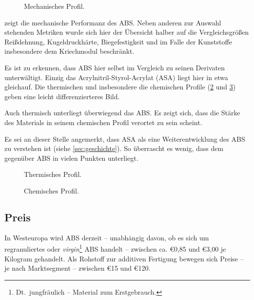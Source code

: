             \begin{figure}[h]
                \centering
                
                \caption{Mechanisches Profil.}
                \label{fig:pc mechanical profile}
            \end{figure}\par
             zeigt die mechanische Performanz des ABS\@. Neben anderen zur Auswahl stehenden
            Metriken wurde sich hier der Übersicht halber auf die Vergleichsgrößen Reißdehnung, Kugeldruckhärte, Biegefestigkeit
            und im Falle der Kunststoffe insbesondere dem Kriechmodul beschränkt.

            Es ist zu erkennen, dass ABS hier selbst im Vergleich zu seinen Derivaten unterwältigt. Einzig das
            Acrylnitril-Styrol-Acrylat (ASA) liegt hier in etwa gleichauf. Die thermischen und insbesondere die chemischen Profile
            (\cref{fig:pc thermal profile} und \cref{fig:pc chemical profile}) geben eine leicht differenzierteres Bild.

            Auch thermisch unterliegt überwiegend das ABS\@. Es zeigt sich, dass die Stärke des Materials in seinem chemischen
            Profil verortet zu sein scheint.

            Es sei an dieser Stelle angemerkt, dass ASA als eine Weiterentwicklung des ABS zu verstehen ist (siehe \cref{sec:geschichte}).
            So überrascht es wenig, dass dem gegenüber ABS in vielen Punkten unterliegt.
            \newpage
            \begin{figure}[H]
                \centering
                
                \caption{Thermisches Profil.}%
                \label{fig:pc thermal profile}
            \end{figure}
            \begin{figure}[H]
                \centering
                
                \caption{Chemisches Profil.}%
                \label{fig:pc chemical profile}
            \end{figure}
            \newpage
            \nocite{datenblattsammlung.KERN.20210201}
        \subsection{Preis}
            In Westeuropa wird ABS derzeit – unabhängig davon, ob es sich um regranuliertes oder \textit{virgin}\footnote{Dt.\ jungfräulich – Material zum Erstgebrauch.}
            ABS handelt – zwischen ca. €0,85 und €3,00 je Kilogram gehandelt\cite{rohstoffboerse.kunststoffweb.de.20210206}.
            Als Rohstoff zur additiven Fertigung bewegen sich Preise – je nach Marktsegment – zwischen €15 und €120.

